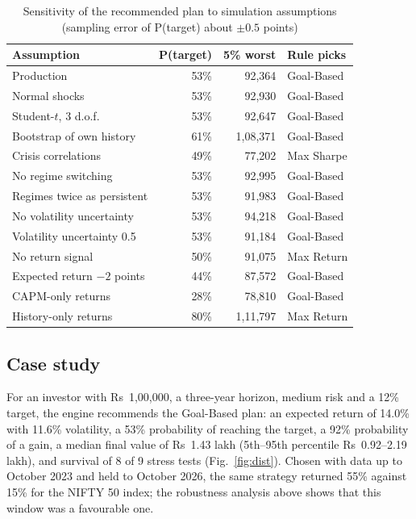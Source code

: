 \documentclass[conference]{IEEEtran}
\begin{document}
\begin{table}[t]
\caption{Sensitivity of the recommended plan to simulation assumptions (sampling error of P(target) about $\pm 0.5$ points)}
\label{tab:sens}
\centering
\footnotesize
\setlength{\tabcolsep}{4pt}
\begin{tabular}{@{}lrrl@{}}
\toprule
Assumption & P(target) & 5\% worst & Rule picks \\
\midrule
Production & 53\% & 92,364 & Goal-Based \\
Normal shocks & 53\% & 92,930 & Goal-Based \\
Student-$t$, 3 d.o.f. & 53\% & 92,647 & Goal-Based \\
Bootstrap of own history & 61\% & 1,08,371 & Goal-Based \\
Crisis correlations & 49\% & 77,202 & Max Sharpe \\
No regime switching & 53\% & 92,995 & Goal-Based \\
Regimes twice as persistent & 53\% & 91,983 & Goal-Based \\
No volatility uncertainty & 53\% & 94,218 & Goal-Based \\
Volatility uncertainty 0.5 & 53\% & 91,184 & Goal-Based \\
No return signal & 50\% & 91,075 & Max Return \\
Expected return $-2$ points & 44\% & 87,572 & Goal-Based \\
CAPM-only returns & 28\% & 78,810 & Goal-Based \\
History-only returns & 80\% & 1,11,797 & Max Return \\
\bottomrule
\end{tabular}
\end{table}

\subsection{Case study}
For an investor with Rs~1,00,000, a three-year horizon, medium risk and a 12\% target, the engine recommends the Goal-Based plan: an expected return of 14.0\% with 11.6\% volatility, a 53\% probability of reaching the target, a 92\% probability of a gain, a median final value of Rs~1.43 lakh (5th--95th percentile Rs~0.92--2.19 lakh), and survival of 8 of 9 stress tests (Fig.~\ref{fig:dist}). Chosen with data up to October 2023 and held to October 2026, the same strategy returned 55\% against 15\% for the NIFTY 50 index; the robustness analysis above shows that this window was a favourable one.
\end{document}
